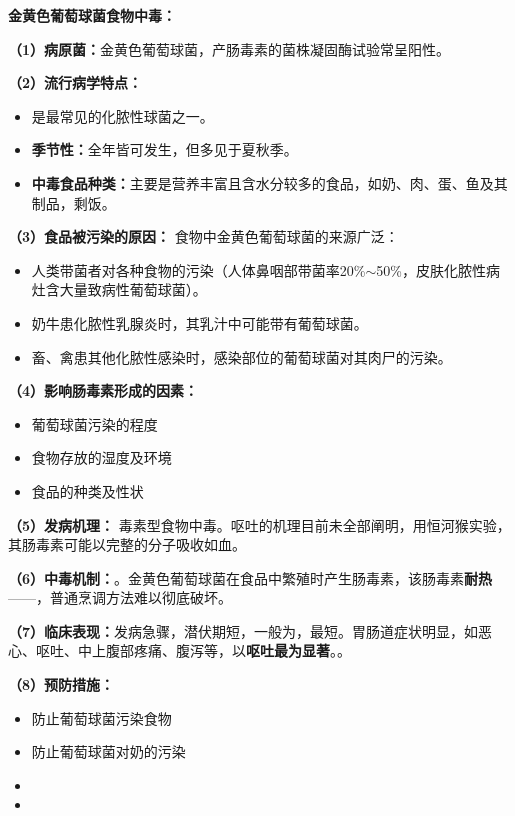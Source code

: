 \begin{keybox}
\textbf{金黄色葡萄球菌食物中毒：}

\textbf{（1）病原菌：}金黄色葡萄球菌，产肠毒素的菌株凝固酶试验常呈阳性。

\textbf{（2）流行病学特点：}
\begin{itemize}[leftmargin=*]
    \item 是最常见的化脓性球菌之一。
    \item \textbf{季节性：}全年皆可发生，但多见于夏秋季。
    \item \textbf{中毒食品种类：}主要是营养丰富且含水分较多的食品，如奶、肉、蛋、鱼及其制品，剩饭。
\end{itemize}

\textbf{（3）食品被污染的原因：}
食物中金黄色葡萄球菌的来源广泛：
\begin{itemize}[leftmargin=*]
    \item 人类带菌者对各种食物的污染（人体鼻咽部带菌率20\%$\sim$50\%，皮肤化脓性病灶含大量致病性葡萄球菌）。
    \item 奶牛患化脓性乳腺炎时，其乳汁中可能带有葡萄球菌。
    \item 畜、禽患其他化脓性感染时，感染部位的葡萄球菌对其肉尸的污染。
\end{itemize}

\textbf{（4）影响肠毒素形成的因素：}
\begin{itemize}[leftmargin=*]
    \item 葡萄球菌污染的程度
    \item 食物存放的湿度及环境
    \item 食品的种类及性状
\end{itemize}

\textbf{（5）发病机理：}\difficulty
毒素型食物中毒。呕吐的机理目前未全部阐明，用恒河猴实验，其肠毒素可能以完整的分子吸收如血。

\textbf{（6）中毒机制：}。金黄色葡萄球菌在食品中繁殖时产生肠毒素，该肠毒素\textbf{耐热}——，普通烹调方法难以彻底破坏。

\textbf{（7）临床表现：}发病急骤，潜伏期短，一般为，最短。胃肠道症状明显，如恶心、呕吐、中上腹部疼痛、腹泻等，以\textbf{呕吐最为显著}。。

\textbf{（8）预防措施：}
\begin{itemize}[leftmargin=*]
    \item 防止葡萄球菌污染食物
    \item 防止葡萄球菌对奶的污染
    \item {}
    \item {}
\end{itemize}
\end{keybox}

